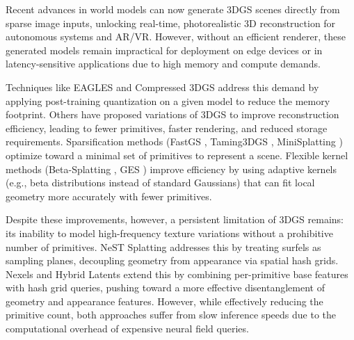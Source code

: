 \documentclass[acmtog,anonymous,review]{acmart}
\begin{document}
Recent advances in world models can now generate 3DGS scenes directly from sparse image inputs, unlocking real-time, photorealistic 3D reconstruction for autonomous systems and AR/VR. However, without an efficient renderer, these generated models remain impractical for deployment on edge devices or in latency-sensitive applications due to high memory and compute demands.

Techniques like EAGLES \cite{NN} and Compressed 3DGS \cite{NN} address this demand by applying post-training quantization on a given model to reduce the memory footprint. 
Others have proposed variations of 3DGS to improve reconstruction efficiency, leading to fewer primitives, faster rendering, and reduced storage requirements.
Sparsification methods (FastGS \cite{NN}, Taming3DGS \cite{NN}, MiniSplatting \cite{NN}) optimize toward a minimal set of primitives to represent a scene. Flexible kernel methods (Beta-Splatting \cite{NN}, GES \cite{NN}) improve efficiency by using adaptive kernels (e.g., beta distributions instead of standard Gaussians) that can fit local geometry more accurately with fewer primitives. 

Despite these improvements, however, a persistent limitation of 3DGS remains: its inability to model high-frequency texture variations without a prohibitive number of primitives. NeST Splatting \cite{NN} addresses this by treating surfels as sampling planes, decoupling geometry from appearance via spatial hash grids. Nexels \cite{NN} and Hybrid Latents \cite{NN} extend this by combining per-primitive base features with hash grid queries, pushing toward a more effective disentanglement of geometry and appearance features. However, while effectively reducing the primitive count, both approaches suffer from slow inference speeds due to the computational overhead of expensive neural field queries.


\end{document}
